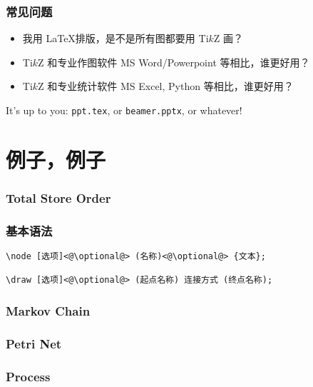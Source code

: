 \documentclass[usenames,xcolor=svgnames,11pt,sans]{beamer}
\let\t\texttt
\begin{document}
\begin{frame}
    \frametitle{常见问题}

    \begin{itemize}
        \item 我用 \LaTeX 排版，是不是所有图都要用 Ti$k$Z 画？
        \pause
        \item Ti$k$Z 和专业作图软件 MS Word/Powerpoint 等相比，谁更好用？
        \pause
        \item Ti$k$Z 和专业统计软件 MS Excel, Python 等相比，谁更好用？
    \end{itemize}

    \pause
    \vspace{20pt}
    It's up to you: \t{ppt.tex}, or \t{beamer.pptx}, or whatever!
\end{frame}

\section{例子，例子}

\begin{frame}
    \frametitle{Total Store Order}

    \centering
\end{frame}

\begin{frame}[fragile]
    \frametitle{基本语法}

    \begin{lstlisting}
\node [选项]<@\optional@> (名称)<@\optional@> {文本};

\draw [选项]<@\optional@> (起点名称) 连接方式 (终点名称);
    \end{lstlisting}
\end{frame}

\begin{frame}
    \frametitle{Markov Chain}

    \centering
\end{frame}

\begin{frame}
    \frametitle{Petri Net}

    \centering
\end{frame}

\begin{frame}
    \frametitle{Process}

    \centering
\end{frame}
\end{document}
